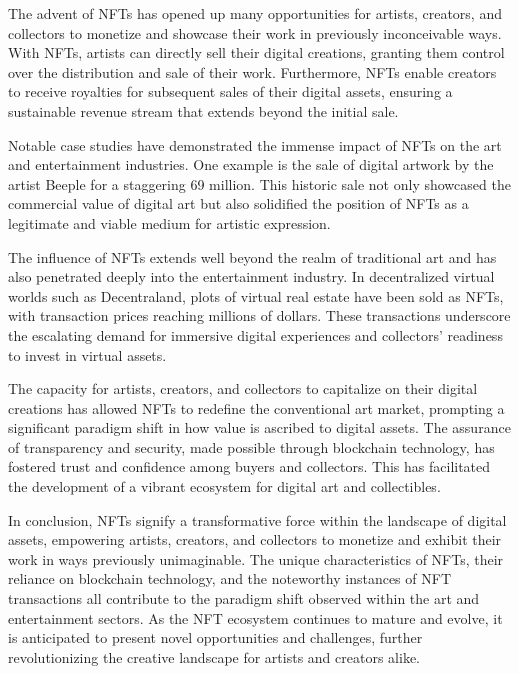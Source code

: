 \documentclass[10pt,twocolumn]{article}
\begin{document}
The advent of NFTs has opened up many opportunities for artists, creators, and collectors to monetize and showcase their work in previously inconceivable ways. With NFTs, artists can directly sell their digital creations, granting them control over the distribution and sale of their work. Furthermore, NFTs enable creators to receive royalties for subsequent sales of their digital assets, ensuring a sustainable revenue stream that extends beyond the initial sale.

Notable case studies have demonstrated the immense impact of NFTs on the art and entertainment industries. One example is the sale of digital artwork by the artist Beeple for a staggering  69 million. This historic sale not only showcased the commercial value of digital art but also solidified the position of NFTs as a legitimate and viable medium for artistic expression. \cite{nftmoney}

The influence of NFTs extends well beyond the realm of traditional art and has also penetrated deeply into the entertainment industry. In decentralized virtual worlds such as Decentraland, plots of virtual real estate have been sold as NFTs, with transaction prices reaching millions of dollars. These transactions underscore the escalating demand for immersive digital experiences and collectors' readiness to invest in virtual assets.

The capacity for artists, creators, and collectors to capitalize on their digital creations has allowed NFTs to redefine the conventional art market, prompting a significant paradigm shift in how value is ascribed to digital assets. The assurance of transparency and security, made possible through blockchain technology, has fostered trust and confidence among buyers and collectors. This has facilitated the development of a vibrant ecosystem for digital art and collectibles.

In conclusion, NFTs signify a transformative force within the landscape of digital assets, empowering artists, creators, and collectors to monetize and exhibit their work in ways previously unimaginable. The unique characteristics of NFTs, their reliance on blockchain technology, and the noteworthy instances of NFT transactions all contribute to the paradigm shift observed within the art and entertainment sectors. As the NFT ecosystem continues to mature and evolve, it is anticipated to present novel opportunities and challenges, further revolutionizing the creative landscape for artists and creators alike.
\end{document}
